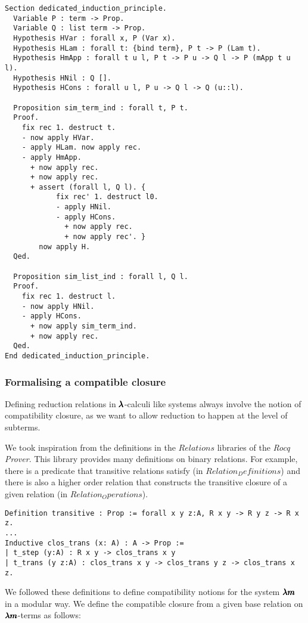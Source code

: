 \begin{lstlisting}[language=Coq]
Section dedicated_induction_principle.
  Variable P : term -> Prop.
  Variable Q : list term -> Prop.
  Hypothesis HVar : forall x, P (Var x).
  Hypothesis HLam : forall t: {bind term}, P t -> P (Lam t).
  Hypothesis HmApp : forall t u l, P t -> P u -> Q l -> P (mApp t u l).
  Hypothesis HNil : Q [].
  Hypothesis HCons : forall u l, P u -> Q l -> Q (u::l).
  
  Proposition sim_term_ind : forall t, P t.
  Proof.
    fix rec 1. destruct t.
    - now apply HVar.
    - apply HLam. now apply rec.
    - apply HmApp.
      + now apply rec.
      + now apply rec.
      + assert (forall l, Q l). {
            fix rec' 1. destruct l0.
            - apply HNil.
            - apply HCons.
              + now apply rec.
              + now apply rec'. }          
        now apply H.
  Qed.      
  
  Proposition sim_list_ind : forall l, Q l.
  Proof.
    fix rec 1. destruct l.
    - now apply HNil.
    - apply HCons.
      + now apply sim_term_ind.
      + now apply rec.
  Qed.          
End dedicated_induction_principle.
\end{lstlisting}

\subsubsection{Formalising a compatible closure}

Defining reduction relations in $\pmb{\lambda}$-calculi like systems always involve the notion of compatibility closure, as we want to allow reduction to happen at the level of subterms.

We took inspiration from the definitions in the \lst$Relations$ libraries of the \textit{Rocq Prover}.
This library provides many definitions on binary relations.
For example, there is a predicate that transitive relations satisfy (in \lst$Relation_Definitions$) and there is also a higher order relation that constructs the transitive closure of a given relation (in \lst$Relation_Operations$).

\begin{lstlisting}[language=Coq]
Definition transitive : Prop := forall x y z:A, R x y -> R y z -> R x z.
...
Inductive clos_trans (x: A) : A -> Prop :=
| t_step (y:A) : R x y -> clos_trans x y
| t_trans (y z:A) : clos_trans x y -> clos_trans y z -> clos_trans x z.
\end{lstlisting}

We followed these definitions to define compatibility notions for the system $\pmb{\lambda m}$ in a modular way.
We define the compatible closure from a given base relation on $\pmb{\lambda m}$-terms as follows:

